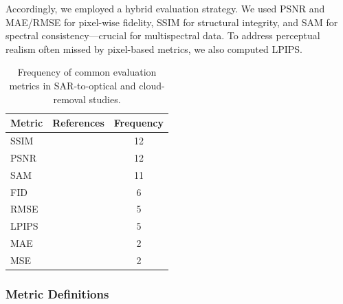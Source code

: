 \documentclass[remotesensing,article,submit,pdftex,moreauthors]{Definitions/mdpi}
\begin{document}
Accordingly, we employed a hybrid evaluation strategy. We used PSNR and MAE/RMSE for pixel-wise fidelity, SSIM for structural integrity, and SAM for spectral consistency—crucial for multispectral data. To address perceptual realism often missed by pixel-based metrics, we also computed LPIPS.

\begin{table}[H]
\centering
\caption{Frequency of common evaluation metrics in SAR-to-optical and cloud-removal studies.}
\label{tab:iqa}
\footnotesize
\begin{tabular}{l p{8cm} c}
\toprule
\textbf{Metric} & \textbf{References} & \textbf{Frequency} \\
\midrule
SSIM & \cite{CR_Advances_Review_ORS, RS_Data_Fusion_GANs_sota, DiffCR, c_diffusion_s2o, s2o_ViT_cGAN, S2MS_GAN, c_guided_fus_s2ot, transfusion_cr, trans_gan_CF, hvt_cgan, msf_gan, diffusion_memory} & 12 \\
PSNR & \cite{CR_Advances_Review_ORS, DiffCR, CR_RS_spati_atten_GAN, s2o_ViT_cGAN, CR_RS_GAN_s2o, S2MS_GAN, c_guided_fus_s2ot, transfusion_cr, trans_gan_CF, hvt_cgan, msf_gan, diffusion_memory} & 12 \\
SAM & \cite{A_cGAN_fuse_sar_MS_CR, RS_Data_Fusion_GANs_sota, CR_RS_GAN_s2o, S2MS_GAN, c_guided_fus_s2ot, transfusion_cr, trans_gan_CF, cond_brownian, hvt_cgan, msf_gan} & 11 \\
FID & \cite{DiffCR, c_diffusion_s2o, s2o_ViT_cGAN, cond_brownian, hvt_cgan, msf_gan} & 6 \\
RMSE & \cite{A_cGAN_fuse_sar_MS_CR, CR_Advances_Review_ORS, RS_Data_Fusion_GANs_sota, CR_RS_GAN_s2o, c_guided_fus_s2ot} & 5 \\
LPIPS  & \cite{CR_Advances_Review_ORS, DiffCR, S2MS_GAN, cond_brownian, diffusion_memory} & 5 \\
MAE & \cite{CR_RS_GAN_s2o, c_guided_fus_s2ot} & 2 \\
MSE & \cite{CR_RS_spati_atten_GAN, trans_gan_CF} & 2 \\
\bottomrule
\end{tabular}
\end{table}

\subsubsection{Metric Definitions}
\end{document}
